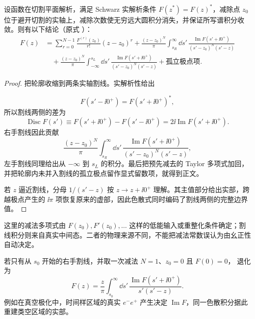 \begin{proposition}
设函数在切割平面解析，满足 Schwarz 实解析条件 $F(z^*)=F(z)^*$，减除点 $z_0$ 位于避开切割的实轴上，减除次数使无穷远大圆积分消失，并保证所写谱积分收敛。则有以下结论（原式 ）：
\begin{equation*}
 \boxed{
 \begin{aligned}
 F(z)
 &=\sum_{r=0}^{N-1}
 \frac{F^{(r)}(z_0)}{r!}(z-z_0)^r
 +\frac{(z-z_0)^N}{\pi}
 \int_{s_R}^{\infty}\!\dd s'\,
 \frac{\operatorname{Im}F(s'+\ii0^+)}{(s'-z_0)^N(s'-z)}
 \\
 &\quad
 +\frac{(z-z_0)^N}{\pi}
 \int_{-\infty}^{s_L}\!\dd s'\,
 \frac{\operatorname{Im}F(s'+\ii0^+)}{(s'-z_0)^N(s'-z)}
 +\text{孤立极点项}.
 \end{aligned}}
\end{equation*}
\end{proposition}
\begin{proof}
把轮廓收缩到两条实轴割线。实解析性给出

\begin{equation*}
 F(s'-\ii0^+)=F(s'+\ii0^+)^*,
\end{equation*}
所以割线两侧的差为
\begin{equation*}
 \operatorname{Disc}F(s')
 \equiv F(s'+\ii0^+)-F(s'-\ii0^+)
 =2\ii\operatorname{Im}F(s'+\ii0^+).
\end{equation*}
右手割线因此贡献
\begin{equation*}
 \frac{(z-z_0)^N}{\pi}
 \int_{s_R}^{\infty}\!\dd s'\,
 \frac{\operatorname{Im}F(s'+\ii0^+)}
 {(s'-z_0)^N(s'-z)},
\end{equation*}
左手割线同理给出从 $-\infty$ 到 $s_L$ 的积分。最后把预先减去的 Taylor 多项式加回，并把轮廓内未并入割线的孤立极点留作显式留数项，就得到正文。

若 $z$ 逼近割线，分母 $1/(s'-z)$ 按 $z\to z+\ii0^+$ 理解。其主值部分给出实部，跨越极点产生的 $\ii\pi$ 项恢复原来的虚部，因此色散式同时编码了割线两侧的完整边界值。
\end{proof}

这里的减法多项式由 $F(z_0),F'(z_0),\ldots$ 这样的低能输入或重整化条件确定；割线积分则来自真实中间态。二者的物理来源不同，不能把减法常数误认为由幺正性自动决定。

若只有从 $s_0$ 开始的右手割线，并取一次减法 $N=1$、$z_0=0$ 且 $F(0)=0$， 退化为
\begin{equation}
 \boxed{
 F(z)
 =\frac{z}{\pi}
 \int_{s_0}^{\infty}\dd s'\,
 \frac{\operatorname{Im}F(s'+\ii0^+)}{s'(s'-z)}.}
 \label{eq:once-subtracted-single-cut-dp9}
\end{equation}
例如在真空极化中，时间样区域的真实 $e^-e^+$ 产生决定 $\operatorname{Im}F$，同一色散积分据此重建类空区域的实部。

